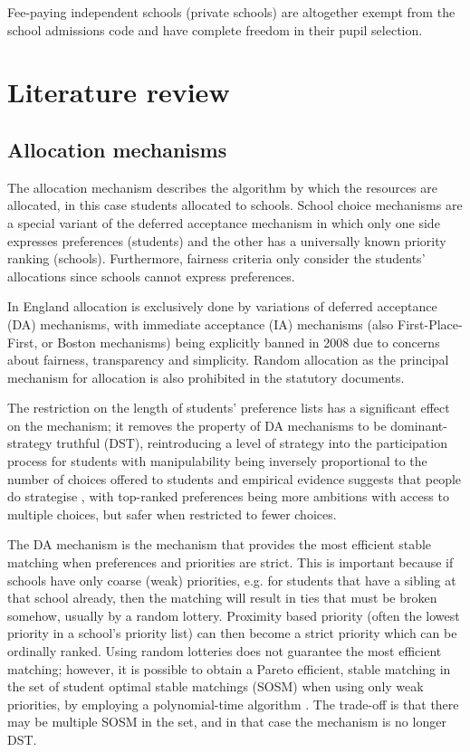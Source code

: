 \documentclass{article}
\begin{document}
\begin{multicols}{2}
Fee-paying independent schools (private schools) are altogether exempt from the school admissions code and have complete freedom in their pupil selection.

\section{Literature review}
\subsection{Allocation mechanisms}
The allocation mechanism describes the algorithm by which the resources are allocated, in this case students allocated to schools. School choice mechanisms are a special variant of the deferred acceptance mechanism in which only one side expresses preferences (students) and the other has a universally known priority ranking (schools). Furthermore, fairness criteria only consider the students' allocations since schools cannot express preferences. 

In England allocation is exclusively done by variations of deferred acceptance (DA) mechanisms, with immediate acceptance (IA) mechanisms (also First-Place-First, or Boston mechanisms) being explicitly banned in 2008 \cite{pathakSchoolAdmissionsReform2013,terrierImmediateAcceptanceDeferred} due to concerns about fairness, transparency and simplicity. Random allocation as the principal mechanism for allocation is also prohibited in the statutory documents. 

The restriction on the length of students' preference lists has a significant effect on the mechanism; it removes the property of DA mechanisms to be dominant-strategy truthful (DST), reintroducing a level of strategy into the participation process for students \cite{haeringerConstrainedSchoolChoice2009} with manipulability being inversely proportional to the number of choices offered to students \cite{pathakSchoolAdmissionsReform2013} and empirical evidence suggests that people do strategise \cite{burgessSchoolChoiceEngland2019}, with top-ranked preferences being more ambitions with access to multiple choices, but safer when restricted to fewer choices. 

The DA mechanism is the mechanism that provides the most efficient stable matching when preferences and priorities are strict. This is important because if schools have only coarse (weak) priorities, e.g. for students that have a sibling at that school already, then the matching will result in ties that must be broken somehow, usually by a random lottery. Proximity based priority (often the lowest priority in a school's priority list) can then become a strict priority which can be ordinally ranked. Using random lotteries does not guarantee the most efficient matching; however, it is possible to obtain a Pareto efficient, stable matching in the set of student optimal stable matchings (SOSM) when using only weak priorities, by employing a polynomial-time algorithm \cite{erdilWhatsMatterTieBreaking2008}. The trade-off is that there may be multiple SOSM in the set, and in that case the mechanism is no longer DST. %


\end{multicols}
\end{document}
